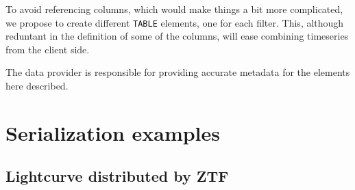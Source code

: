 \documentclass[11pt,a4paper]{ivoa}
\let\fg=\color
\def\elem#1{{\tt{\fg{DarkRed}#1}}}
\begin{document}
\begingroup

\endgroup

To avoid referencing columns, which would make things a bit more complicated, we propose to create different \elem{TABLE} elements, one for each filter. This, although reduntant in the definition of some of the columns, will ease combining timeseries from the client side. 




The data provider is responsible for providing accurate metadata for the elements here described.

\section{Serialization examples}
\subsection{Lightcurve distributed by ZTF}
\end{document}
